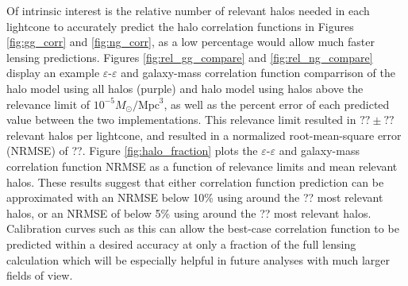 \documentclass[%
 reprint,
 amsmath,amssymb,
 aps,nofootinbib
]{revtex4-1}
\begin{document}
Of intrinsic interest is the relative number of relevant halos needed in each lightcone to accurately predict the halo correlation functions in Figures \ref{fig:gg_corr} and \ref{fig:ng_corr}, as a low percentage would allow much faster lensing predictions. Figures \ref{fig:rel_gg_compare} and \ref{fig:rel_ng_compare} display an example $\varepsilon$-$\varepsilon$ and galaxy-mass correlation function comparrison of the halo model using all halos (purple) and halo model using halos above the relevance limit of ${10^{-5} M_{\odot}/\text{Mpc}^3}$, as well as the percent error of each predicted value between the two implementations. This relevance limit resulted in $??\pm??$ relevant halos per lightcone, and resulted in a normalized root-mean-square error (NRMSE) of ??. Figure \ref{fig:halo_fraction} plots the $\varepsilon$-$\varepsilon$ and galaxy-mass correlation function NRMSE as a function of relevance limits and mean relevant halos. These results suggest that either correlation function prediction can be approximated with an NRMSE below 10\% using around the ?? most relevant halos, or an NRMSE of below 5\% using around the ?? most relevant halos. Calibration curves such as this can allow the best-case correlation function to be predicted within a desired accuracy at only a fraction of the full lensing calculation which will be especially helpful in future analyses with much larger fields of view.
\end{document}
